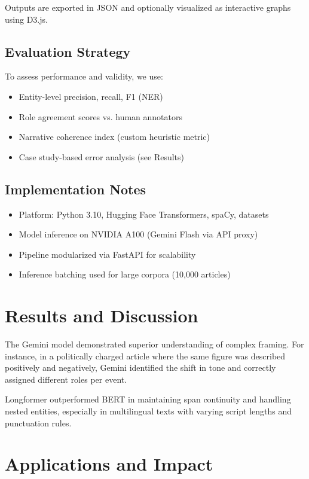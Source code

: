 \documentclass[12pt]{article}
\begin{document}
Outputs are exported in JSON and optionally visualized as interactive graphs using D3.js.

\subsection{Evaluation Strategy}

To assess performance and validity, we use:
\begin{itemize}
    \item Entity-level precision, recall, F1 (NER)
    \item Role agreement scores vs. human annotators
    \item Narrative coherence index (custom heuristic metric)
    \item Case study-based error analysis (see Results)
\end{itemize}

\subsection{Implementation Notes}

\begin{itemize}
    \item Platform: Python 3.10, Hugging Face Transformers, spaCy, datasets
    \item Model inference on NVIDIA A100 (Gemini Flash via API proxy)
    \item Pipeline modularized via FastAPI for scalability
    \item Inference batching used for large corpora (10,000 articles)
\end{itemize}



\section{Results and Discussion}

The Gemini model demonstrated superior understanding of complex framing. For instance, in a politically charged article where the same figure was described positively and negatively, Gemini identified the shift in tone and correctly assigned different roles per event.

Longformer outperformed BERT in maintaining span continuity and handling nested entities, especially in multilingual texts with varying script lengths and punctuation rules.

\section{Applications and Impact}
\end{document}
